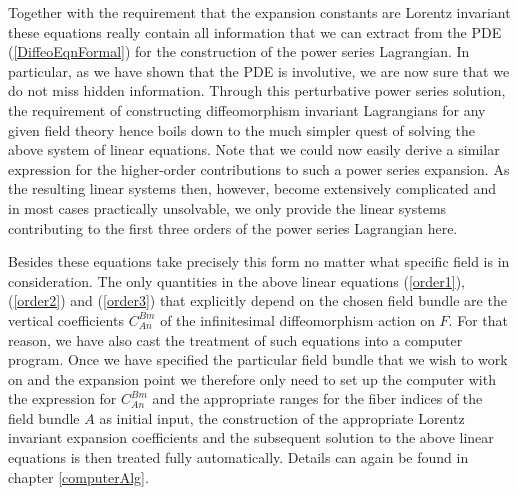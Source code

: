 Together with the requirement that the expansion constants are Lorentz invariant these equations really contain all information that we can extract from the PDE (\ref{DiffeoEqnFormal}) for the construction of the power series Lagrangian. In particular, as we have shown that the PDE is involutive, we are now sure that we do not miss hidden information. Through this perturbative power series solution, the requirement of constructing diffeomorphism invariant Lagrangians for any given field theory hence boils down to the much simpler quest of solving the above system of linear equations.
Note that we could now easily derive a similar expression for the higher-order contributions to such a power series expansion. As the resulting linear systems then, however, become extensively complicated and in most cases practically unsolvable, we only provide the linear systems contributing to the first three orders of the power series Lagrangian here. 

Besides these equations take precisely this form no matter what specific field is in consideration. The only quantities in the above linear equations (\ref{order1}), (\ref{order2}) and (\ref{order3}) that explicitly depend on the chosen field bundle are the vertical coefficients $C^{Bm}_{An}$ of the infinitesimal diffeomorphism action on $F$. For that reason, we have also cast the treatment of such equations into a computer program. Once we have specified the particular field bundle that we wish to work on and the expansion point we therefore only need to set up the computer with the expression for $C_{An}^{Bm}$ and the appropriate ranges for the fiber indices of the field bundle $A$ as initial input, the construction of the appropriate Lorentz invariant expansion coefficients and the subsequent solution to the above linear equations is then treated fully automatically. Details can again be found in chapter \ref{computerAlg}. 

